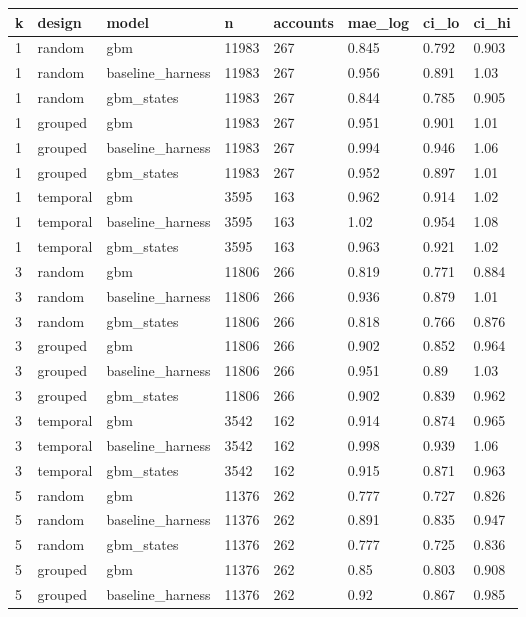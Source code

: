 \begin{tabular}{llllllll}
\toprule
k & design & model & n & accounts & mae\_log & ci\_lo & ci\_hi \\
\midrule
1 & random & gbm & 11983 & 267 & 0.845 & 0.792 & 0.903 \\
1 & random & baseline\_harness & 11983 & 267 & 0.956 & 0.891 & 1.03 \\
1 & random & gbm\_states & 11983 & 267 & 0.844 & 0.785 & 0.905 \\
1 & grouped & gbm & 11983 & 267 & 0.951 & 0.901 & 1.01 \\
1 & grouped & baseline\_harness & 11983 & 267 & 0.994 & 0.946 & 1.06 \\
1 & grouped & gbm\_states & 11983 & 267 & 0.952 & 0.897 & 1.01 \\
1 & temporal & gbm & 3595 & 163 & 0.962 & 0.914 & 1.02 \\
1 & temporal & baseline\_harness & 3595 & 163 & 1.02 & 0.954 & 1.08 \\
1 & temporal & gbm\_states & 3595 & 163 & 0.963 & 0.921 & 1.02 \\
3 & random & gbm & 11806 & 266 & 0.819 & 0.771 & 0.884 \\
3 & random & baseline\_harness & 11806 & 266 & 0.936 & 0.879 & 1.01 \\
3 & random & gbm\_states & 11806 & 266 & 0.818 & 0.766 & 0.876 \\
3 & grouped & gbm & 11806 & 266 & 0.902 & 0.852 & 0.964 \\
3 & grouped & baseline\_harness & 11806 & 266 & 0.951 & 0.89 & 1.03 \\
3 & grouped & gbm\_states & 11806 & 266 & 0.902 & 0.839 & 0.962 \\
3 & temporal & gbm & 3542 & 162 & 0.914 & 0.874 & 0.965 \\
3 & temporal & baseline\_harness & 3542 & 162 & 0.998 & 0.939 & 1.06 \\
3 & temporal & gbm\_states & 3542 & 162 & 0.915 & 0.871 & 0.963 \\
5 & random & gbm & 11376 & 262 & 0.777 & 0.727 & 0.826 \\
5 & random & baseline\_harness & 11376 & 262 & 0.891 & 0.835 & 0.947 \\
5 & random & gbm\_states & 11376 & 262 & 0.777 & 0.725 & 0.836 \\
5 & grouped & gbm & 11376 & 262 & 0.85 & 0.803 & 0.908 \\
5 & grouped & baseline\_harness & 11376 & 262 & 0.92 & 0.867 & 0.985 \\

\end{tabular}

